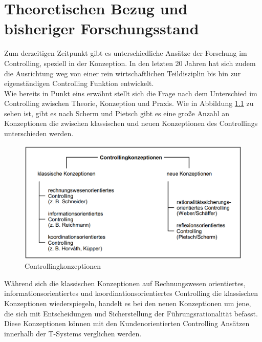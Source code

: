 
\chapter{Theoretischen Bezug und bisheriger Forschungsstand }
\label{ch:Theoretischen_Bezug}


Zum derzeitigen Zeitpunkt gibt es unterschiedliche Ansätze der Forschung im Controlling, speziell in der Konzeption. In den letzten 20 Jahren hat sich zudem die Ausrichtung weg von einer rein wirtschaftlichen Teildisziplin bis hin zur eigenständigen Controlling Funktion entwickelt.
\\
Wie bereits in Punkt eins erwähnt stellt sich die Frage nach dem Unterschied im Controlling zwischen Theorie, Konzeption und Praxis. Wie in Abbildung \ref{fig:Controllingkonzeption} zu sehen ist, gibt es nach Scherm und Pietsch gibt es eine große Anzahl an Konzeptionen die zwischen klassischen und neuen Konzeptionen des Controllings unterschieden werden.

\begin{figure}[H]
 \centering
 \includegraphics[scale=0.45]{images/Controllingkonzeption.png}
 \caption{Controllingkonzeptionen \cite{fig:Controllingkonzeption}}
 \label{fig:Controllingkonzeption}
\end{figure}

Während sich die klassischen Konzeptionen auf Rechnungswesen orientiertes, informationsorientiertes und koordinationsorientiertes Controlling die klassischen Konzeptionen wiederspiegeln, handelt es bei den neuen Konzeptionen um jene, die sich mit Entscheidungen und Sicherstellung der Führungsrationalität befasst.
\\
Diese Konzeptionen können mit den Kundenorientierten Controlling Ansätzen innerhalb der T-Systems verglichen werden.


